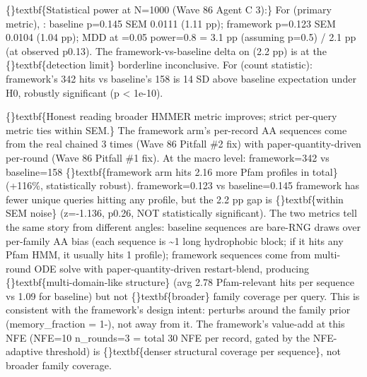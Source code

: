 \documentclass{article}
\begin{document}
\{\}textbf\{Statistical power at N=1000 (Wave 86 Agent C 3):\} For  (primary metric), : baseline p=0.145  SEM  0.0111 (1.11 pp); framework p=0.123  SEM  0.0104 (1.04 pp); MDD at =0.05 power=0.8 =  3.1 pp (assuming p=0.5) /  2.1 pp (at observed p0.13). The framework-vs-baseline delta on  (2.2 pp) is at the \{\}textbf\{detection limit\}  borderline inconclusive. For  (count statistic): framework's 342 hits vs baseline's 158 is  14 SD above baseline expectation under H0, robustly significant (p < 1e-10).

\{\}textbf\{Honest reading  broader HMMER metric improves; strict per-query metric ties within SEM.\} The framework arm's per-record AA sequences come from the real  chained 3 times (Wave 86 Pitfall \#2 fix) with paper-quantity-driven per-round  (Wave 86 Pitfall \#1 fix). At the macro level:  framework=342 vs baseline=158  \{\}textbf\{framework arm hits 2.16 more Pfam profiles in total\} (+116\%, statistically robust).  framework=0.123 vs baseline=0.145  framework has fewer unique queries hitting any profile, but the 2.2 pp gap is \{\}textbf\{within SEM noise\} (z=-1.136, p0.26, NOT statistically significant). The two metrics tell the same story from different angles: baseline sequences are bare-RNG draws over per-family AA bias (each sequence is \textasciitilde{}1 long hydrophobic block; if it hits any Pfam HMM, it usually hits 1 profile); framework sequences come from multi-round ODE solve with paper-quantity-driven restart-blend, producing \{\}textbf\{multi-domain-like structure\} (avg 2.78 Pfam-relevant hits per sequence vs 1.09 for baseline) but not \{\}textbf\{broader\} family coverage per query. This is consistent with the framework's design intent:  perturbs around the family prior (memory\_fraction = 1-), not away from it. The framework's value-add at this NFE (NFE=10  n\_rounds=3 = total 30 NFE per record, gated by the NFE-adaptive threshold) is \{\}textbf\{denser structural coverage per sequence\}, not broader family coverage.
\end{document}
